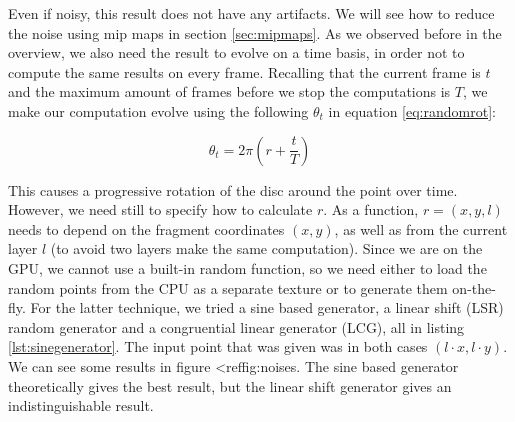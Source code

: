 Even if noisy, this result does not have any artifacts. We will see how to reduce the noise using mip maps in section \ref{sec:mipmaps}. As we observed before in the overview, we also need the result to evolve on a time basis, in order not to compute the same results on every frame. Recalling that the current frame is $t$ and the maximum amount of frames before we stop the computations is $T$, we make our computation evolve using the following $\theta_t$ in equation \ref{eq:randomrot}:

$$
\theta_t = 2 \pi \left(r + \frac{t}{T}\right)
$$

This causes a progressive rotation of the disc around the point over time. However, we need still to specify how to calculate $r$. As a function, $r = (x,y,l)$ needs to depend on the fragment coordinates $(x,y)$, as well as from the current layer $l$ (to avoid two layers make the same computation). Since we are on the GPU, we cannot use a built-in random function, so we need either to load the random points from the CPU as a separate texture or to generate them on-the-fly. For the latter technique, we tried a sine based generator, a linear shift (LSR) random generator and a congruential linear generator (LCG), all in listing \ref{lst:sinegenerator}. The input point that was given was in both cases $(l \cdot x, l \cdot y)$. We can see some results in figure <ref{fig:noises}. The sine based generator theoretically gives the best result, but the linear shift generator gives an indistinguishable result.

